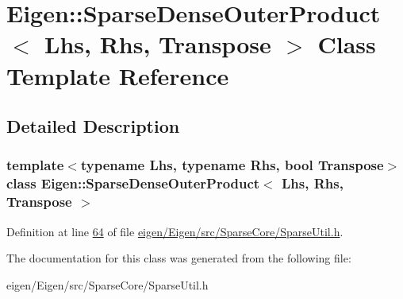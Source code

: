 \hypertarget{class_eigen_1_1_sparse_dense_outer_product}{}\section{Eigen\+:\+:Sparse\+Dense\+Outer\+Product$<$ Lhs, Rhs, Transpose $>$ Class Template Reference}
\label{class_eigen_1_1_sparse_dense_outer_product}


\subsection{Detailed Description}
\subsubsection*{template$<$typename Lhs, typename Rhs, bool Transpose$>$\newline
class Eigen\+::\+Sparse\+Dense\+Outer\+Product$<$ Lhs, Rhs, Transpose $>$}



Definition at line \hyperlink{eigen_2_eigen_2src_2_sparse_core_2_sparse_util_8h_source_l00064}{64} of file \hyperlink{eigen_2_eigen_2src_2_sparse_core_2_sparse_util_8h_source}{eigen/\+Eigen/src/\+Sparse\+Core/\+Sparse\+Util.\+h}.



The documentation for this class was generated from the following file\+:\begin{DoxyCompactItemize}
\item 
eigen/\+Eigen/src/\+Sparse\+Core/\+Sparse\+Util.\+h\end{DoxyCompactItemize}
